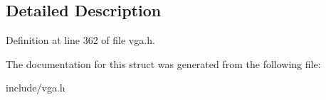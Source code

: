 \subsection{Detailed Description}


Definition at line 362 of file vga.\-h.



The documentation for this struct was generated from the following file\-:\begin{DoxyCompactItemize}
\item 
include/vga.\-h\end{DoxyCompactItemize}
